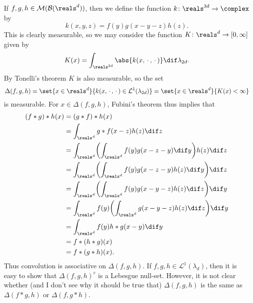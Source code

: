 \documentclass[article, a4paper, 11pt, oneside]{memoir}
\numberwithin{equation}{chapter}
\newcommand{\calM}{\mathcal{M}}
\newcommand{\calL}{\mathcal{L}}
\newcommand{\borel}{\mathcal{B}}
\theoremstyle{nonumberplain}
\begin{document}
\begin{remarkbreak}
	If $f,g,h \in \calM(\borel(\reals^d))$, then we define the function $k \colon \reals^{3d} \to \complex$ by
	\begin{equation*}
		k(x,y,z)
			= f(y) g(x-y-z) h(z).
	\end{equation*}
	This is clearly measurable, so we may consider the function $K \colon \reals^d \to [0,\infty]$ given by
	\begin{equation*}
		K(x)
			= \int_{\reals^{2d}} \abs{k(x,\,\cdot\,,\,\cdot\,)} \dif \lambda_{2d}.
	\end{equation*}
	By Tonelli's theorem $K$ is also measurable, so the set
	\begin{equation*}
		\Delta(f,g,h)
			= \set{x \in \reals^d }{ k(x,\,\cdot\,,\,\cdot\,) \in \calL^1(\lambda_{2d}) }
			= \set{x \in \reals^d }{ K(x) < \infty }
	\end{equation*}
	is measurable. For $x \in \Delta(f,g,h)$, Fubini's theorem thus implies that
	\begin{align*}
		(f * g) * h(x)
			&= (g * f) * h(x) \\
			&= \int_{\reals^d} g * f(x-z) h(z) \dif z \\
			&= \int_{\reals^d} \biggl( \int_{\reals^d} f(y) g(x-z-y) \dif y \biggr) h(z) \dif z \\
			&= \int_{\reals^d} \biggl( \int_{\reals^d} f(y) g(x-z-y) h(z) \dif y \biggr) \dif z \\
			&= \int_{\reals^d} \biggl( \int_{\reals^d} f(y) g(x-y-z) h(z) \dif z \biggr) \dif y \\
			&= \int_{\reals^d} f(y) \biggl( \int_{\reals^d} g(x-y-z) h(z) \dif z \biggr) \dif y \\
			&= \int_{\reals^d} f(y) h * g(x-y) \dif y \\
			&= f * (h * g)(x) \\
			&= f * (g * h)(x).
	\end{align*}
	Thus convolution is associative on $\Delta(f,g,h)$. If $f,g,h \in \calL^1(\lambda_d)$, then it is easy to show that $\Delta(f,g,h)^c$ is a Lebesgue null-set. However, it is not clear whether (and I don't see why it should be true that) $\Delta(f,g,h)$ is the same as $\Delta(f*g,h)$ or $\Delta(f,g*h)$.
\end{remarkbreak}
\end{document}
